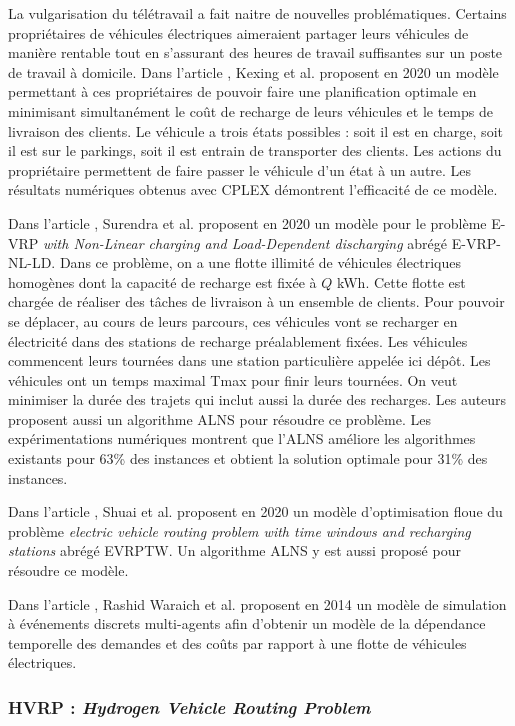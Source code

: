 La vulgarisation du télétravail a fait naitre de nouvelles problématiques. Certains propriétaires de véhicules électriques aimeraient partager leurs véhicules de manière rentable tout en s'assurant des heures de travail suffisantes sur un poste de travail à domicile. Dans l'article \cite{EVRP_Kexing_2020}, Kexing et al. proposent en 2020 un modèle permettant à ces propriétaires de pouvoir faire une planification optimale en minimisant simultanément le coût de recharge de leurs véhicules et le temps de livraison des clients. Le véhicule a trois états possibles : soit il est en charge, soit il est sur le parkings, soit il est entrain de transporter des clients. Les actions du propriétaire permettent de faire passer le véhicule d'un état à un autre. Les résultats numériques obtenus avec CPLEX démontrent l'efficacité de ce modèle.

Dans l'article \cite{EVRP_Surendra_2020}, Surendra et al. proposent en 2020 un modèle pour le problème E-VRP \textit{with Non-Linear charging and Load-Dependent discharging} abrégé E-VRP-NL-LD. Dans ce problème, on a une flotte illimité de véhicules électriques homogènes dont la capacité de recharge est fixée à $Q$ kWh. Cette flotte est chargée de réaliser des tâches de livraison à un ensemble de clients. Pour pouvoir se déplacer, au cours de leurs parcours, ces véhicules vont se recharger en électricité dans des stations de recharge préalablement fixées. Les véhicules commencent leurs tournées dans une station particulière appelée ici dépôt. Les véhicules ont un temps maximal Tmax pour finir leurs tournées. On veut minimiser la durée des trajets qui inclut aussi la durée des recharges. Les auteurs proposent aussi un algorithme ALNS pour résoudre ce problème. Les expérimentations numériques montrent que l'ALNS améliore les algorithmes existants pour 63\% des instances et obtient la solution optimale pour 31\% des instances.
 
Dans l'article \cite{EVRP_Shuai_2020}, Shuai et al. proposent en 2020 un modèle d'optimisation floue du problème \textit{electric vehicle routing problem with time windows and recharging stations} abrégé EVRPTW. Un algorithme ALNS y est aussi proposé pour résoudre ce modèle.

Dans l'article \cite{article_HVRP4}, Rashid Waraich et al. proposent en 2014 un modèle de simulation à événements discrets multi-agents afin d'obtenir un modèle de la dépendance temporelle des demandes et des coûts par rapport à une flotte de véhicules électriques. 


\subsubsection{HVRP : \textit{Hydrogen Vehicle Routing Problem}}


